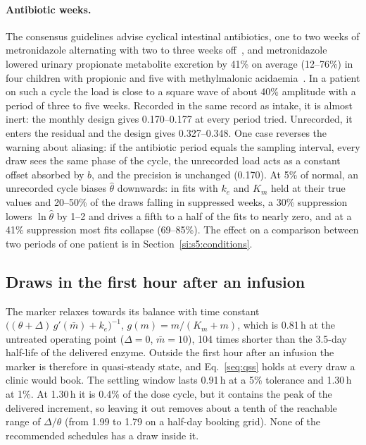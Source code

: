 \paragraph{Antibiotic weeks.} The consensus guidelines advise cyclical intestinal antibiotics,
one to two weeks of metronidazole alternating with two to three weeks off~\cite{pa_guidelines},
and metronidazole lowered urinary propionate metabolite excretion by 41\% on average (12--76\%)
in four children with propionic and five with methylmalonic acidaemia~\cite{metronidazole_pa}.
In a patient on such a cycle the load is close to a square wave of about 40\% amplitude with a
period of three to five weeks. Recorded
in the same record as intake, it is almost inert: the monthly design gives 0.170--0.177 at every
period tried. Unrecorded, it enters the residual and the design gives 0.327--0.348. One case
reverses the warning about aliasing: if the antibiotic period equals the sampling interval, every
draw sees the same phase of the cycle, the unrecorded load acts as a constant offset absorbed by
$b$, and the precision is unchanged (0.170). At 5\% of normal, an unrecorded cycle biases
$\hat\theta$ downwards: in fits with $k_e$ and $K_m$ held at their true values and 20--50\% of
the draws falling in suppressed weeks, a 30\% suppression lowers $\ln\hat\theta$ by 1--2 and
drives a fifth to a half of the fits to nearly zero, and at a 41\% suppression most fits
collapse (69--85\%). The effect on a comparison between two periods of one patient is in
Section~\ref{si:s5:conditions}.

\subsection{Draws in the first hour after an infusion}
\label{si:s2:firsthour}

The marker relaxes towards its balance with time constant
$\bigl((\theta+\Delta)\,g'(\bar m)+k_e\bigr)^{-1}$, $g(m)=m/(K_m+m)$, which is 0.81\,h at the
untreated operating point ($\Delta=0$, $\bar m=10$\uM), 104 times shorter than the 3.5-day half-life of the delivered enzyme. Outside the
first hour after an infusion the marker is therefore in quasi-steady state, and
Eq.~\eqref{seq:qss} holds at every draw a clinic would book. The settling window lasts 0.91\,h at
a 5\% tolerance and 1.30\,h at 1\%. At 1.30\,h it is 0.4\% of the dose cycle, but it contains the
peak of the
delivered increment, so leaving it out removes about a tenth of the reachable range of
$\Delta/\theta$ (from 1.99 to 1.79 on a half-day booking grid). None of the recommended schedules
has a draw inside it.

